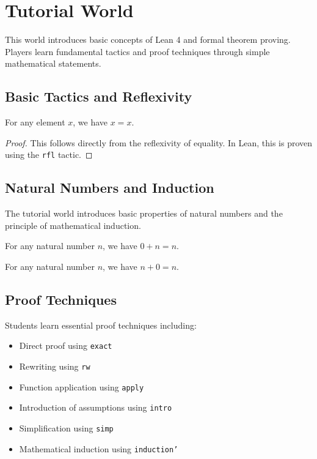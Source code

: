 \chapter{Tutorial World}

This world introduces basic concepts of Lean 4 and formal theorem proving. Players learn fundamental tactics and proof techniques through simple mathematical statements.

\section{Basic Tactics and Reflexivity}

\begin{lemma}
\label{tutorial-reflexivity}
\uses{}
For any element $x$, we have $x = x$.
\end{lemma}

\begin{proof}
This follows directly from the reflexivity of equality. In Lean, this is proven using the \texttt{rfl} tactic.
\end{proof}

\section{Natural Numbers and Induction}

The tutorial world introduces basic properties of natural numbers and the principle of mathematical induction.

\begin{lemma}
\label{tutorial-zero-add}
\uses{}
For any natural number $n$, we have $0 + n = n$.
\end{lemma}

\begin{lemma}
\label{tutorial-add-zero}
\uses{}
For any natural number $n$, we have $n + 0 = n$.
\end{lemma}

\section{Proof Techniques}

Students learn essential proof techniques including:
\begin{itemize}
    \item Direct proof using \texttt{exact}
    \item Rewriting using \texttt{rw}
    \item Function application using \texttt{apply}
    \item Introduction of assumptions using \texttt{intro}
    \item Simplification using \texttt{simp}
    \item Mathematical induction using \texttt{induction'}
\end{itemize}

